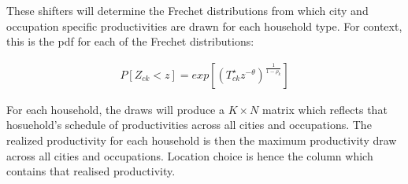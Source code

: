 \documentclass[10pt]{article}
\begin{document}
\vspace{2em}

These shifters will determine the Frechet distributions from which city and occupation specific productivities are drawn for each household type. For context, this is the pdf for each of the Frechet distributions:

\begin{align}
    P[Z_{ck} < z] = exp[(T_{ck}^{\star} z^{-\theta})^{\frac{1}{1 - \rho_k}}]
\end{align}

For each household, the draws will produce a $K \times N$ matrix which reflects that hosuehold's schedule of productivities across all cities and occupations. The realized productivity for each household is then the maximum productivity draw across all cities and occupations. Location choice is hence the column which contains that realised productivity.
\end{document}

